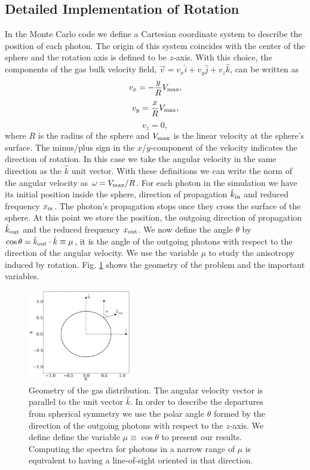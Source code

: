 \subsection{Detailed Implementation of Rotation}
In the Monte Carlo code we define a Cartesian coordinate system to
describe the position of each photon. The origin of this system
coincides with the center of the sphere and the rotation axis is defined
to be $z$-axis. With this choice, the components of the gas bulk velocity
field, $\vec{v} = v_{x}\hat{i} + v_{y}\hat{j} + v_{z}\hat{k}$, can be
written as
\begin{equation}
v_{x}=-\frac{y}{R}V_{\rm max}, \label{subeq1}
\end{equation}
\begin{equation}
v_{y}=\frac{x}{R}V_{\rm max}, \label{subeq2}
\end{equation}
\begin{equation}
v_{z}=0, \label{subeq3}
\end{equation}
%
where $R$ is the radius of the sphere and $V_{\rm max}$ is the linear
velocity at the sphere's surface. The minus/plus sign in the
$x$/$y$-component of the velocity indicates the direction of
rotation. In this case we take the angular velocity in the same
direction as the $\hat{k}$ unit vector. With these definitions we can
write the norm of the angular velocity as $\omega=V_{\rm max}/R$.
For each photon in the simulation we have its initial position inside
the sphere, direction of propagation $\hat{k}_{\rm in}$ and reduced
frequency $x_{\rm in}$.
The photon's propagation stops once they cross the
surface of the sphere. At this point we store the position, the outgoing direction
of propagation $\hat{k}_{\rm out}$ and the reduced frequency $x_{\rm
out}$. We now define the angle $\theta$ by $\cos\theta = \hat{k}_{\rm out}\cdot
\hat{k}\equiv \mu$, it is the angle of the outgoing photons with
respect to the direction of the angular velocity. We use the variable $\mu$ to
study the anisotropy induced by rotation. Fig. \ref{fig:geometry}
shows the geometry of the problem and the important variables.
\begin{figure}
\begin{center}
\includegraphics[width=0.4\textwidth]{Figures/f1.pdf}
\end{center}
\caption{Geometry of the gas distribution. The angular velocity vector
is parallel to the unit vector $\hat{k}$. In order to describe the
departures from spherical symmetry we use the polar angle $\theta$
formed by the direction of the outgoing photons with respect to the
$z$-axis. We define define the variable $\mu\equiv\cos\theta$ 
to present our results. Computing the spectra for photons in
a narrow range of $\mu$ is equivalent to having a line-of-sight
oriented in that direction.
\label{fig:geometry}}
\end{figure}
